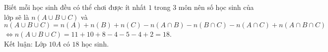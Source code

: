 \begin{bt}
{\begin{enumerate}[Cách 1.]
Biết mỗi học sinh đều có thể chơi được ít nhất $1$ trong $3$ môn nên số học sinh của lớp sẽ là
$ n(A\cup B\cup C) $ và\\
$ n(A\cup B\cup C)=n(A)+n(B)+n(C)-n(A\cap B)- n(B\cap C)-n(A\cap C)+n(A\cap B\cap C)$\\
$ \Leftrightarrow  n(A\cup B\cup C)=11+10+8-4-5-4+2=18$.\\
Kết luận: Lớp $ 10A $  có $ 18 $  học sinh.
\end{enumerate}
}
\end{bt}



